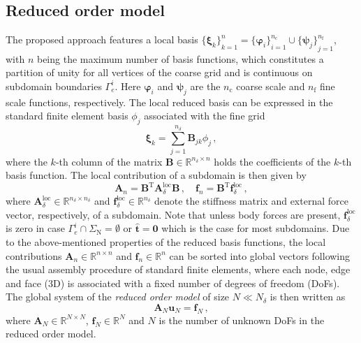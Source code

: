 \documentclass[AMA,STIX1COL,doublespace]{WileyNJD-v2}
\begin{document}
\subsection{Reduced order model}%
\label{sub:reduced_order_model}
The proposed approach features a local basis ${\{\bm{\xi}_k\}}_{k=1}^n = {\{\bm{\varphi}_i\}}_{i=1}^{n_{\mathrm{c}}} \cup{\{\bm{\psi}_j\}}_{j=1}^{n_{\mathrm{f}}}$, with $n$ being the maximum number of basis functions, which constitutes a partition of unity for all vertices of the coarse grid and is continuous on subdomain boundaries $\varGamma_e^i$.
Here $\bm{\varphi}_i$ and $\bm{\psi}_j$ are the $n_{\mathrm{c}}$ coarse scale and $n_{\mathrm{f}}$ fine scale functions, respectively.
The local reduced basis can be expressed in the standard finite element basis $\phi_j$ associated with the fine grid
\begin{equation}
	\bm{\xi}_k = \sum_{j=1}^{n_{\delta}} \bm{B}_{jk} \phi_j\,,
\end{equation}
where the $k$-th column of the matrix $\bm{B}\in\mathbb{R}^{n_{\delta}\times n}$ holds the coefficients of the $k$-th basis function.
The local contribution of a subdomain is then given by
\begin{equation}
	\bm{A}_{n} = \bm{B}^{\mathrm{T}} \bm{A}^{\mathrm{loc}}_{\delta} \bm{B}\,,\quad \bm{f}_{n} = \bm{B}^{\mathrm{T}}\bm{f}^{\mathrm{loc}}_{\delta}\,,
\end{equation}
where $\bm{A}^{\mathrm{loc}}_{\delta}\in\mathbb{R}^{n_{\delta}\times n_{\delta}}$ and $\bm{f}^{\mathrm{loc}}_{\delta}\in\mathbb{R}^{n_{\delta}}$ denote the stiffness matrix and external force vector, respectively, of a subdomain.
Note that unless body forces are present, $\bm{f}^{\mathrm{loc}}_{\delta}$ is zero in case $\varGamma^i_e\cap\varSigma_{\mathrm{N}}=\emptyset$ or $\hat{\bm{t}}=\bm{0}$ which is the case for most subdomains. 
Due to the above-mentioned properties of the reduced basis functions, the local contributions $\bm{A}_{n}\in\mathbb{R}^{n\times n}$ and $\bm{f}_{n}\in\mathbb{R}^{n}$ can be sorted into global vectors following the usual assembly procedure of standard finite elements, where each node, edge and face (3D) is associated with a fixed number of degrees of freedom (DoFs).
The global system of the \textit{reduced order model} of size $N\ll N_{\delta}$ is then written as
\begin{equation}
	\label{eq:rom}
	\bm{A}_{N} \bm{u}_{N} = \bm{f}_N\,,
\end{equation}
where $\bm{A}_{N}\in\mathbb{R}^{N\times N}$, $\bm{f}_{N}\in\mathbb{R}^{N}$ and $N$ is the number of unknown DoFs in the reduced order model.
\end{document}
